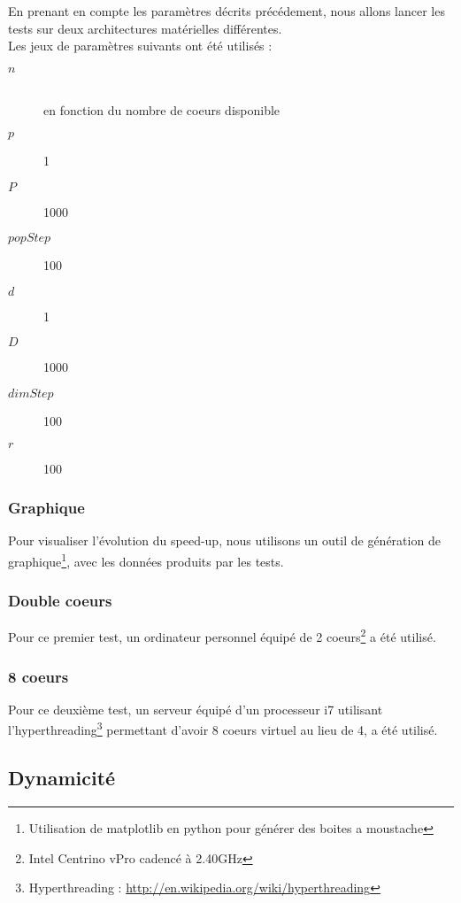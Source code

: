 \documentclass[oneside,11pt]{article}
\begin{document}
\begin{empfile}
En prenant en compte les paramètres décrits précédement, nous allons lancer les tests sur deux architectures matérielles différentes.\\

Les jeux de paramètres suivants ont été utilisés :

\begin{description}
\item[$n$] \hfill \\
en fonction du nombre de coeurs disponible
\item[$p$] 1
\item[$P$] 1000
\item[$popStep$] 100
\item[$d$] 1
\item[$D$] 1000
\item[$dimStep$] 100
\item[$r$] 100
\end{description}

\subsubsection{Graphique}

Pour visualiser l'évolution du speed-up, nous utilisons un outil de génération de graphique\footnote{Utilisation de matplotlib en python pour générer des boites a moustache}, avec les données produits par les tests.

\subsubsection{Double coeurs}

Pour ce premier test, un ordinateur personnel équipé de 2 coeurs\footnote{Intel Centrino vPro cadencé à 2.40GHz} a été utilisé.\cite{knuth, lamport}

\subsubsection{8 coeurs}

Pour ce deuxième test, un serveur équipé d'un processeur i7 utilisant l'hyperthreading\footnote{Hyperthreading : \url{http://en.wikipedia.org/wiki/hyperthreading}} permettant d'avoir 8 coeurs virtuel au lieu de 4, a été utilisé.

\subsection{Dynamicité}


\end{empfile}
\end{document}
